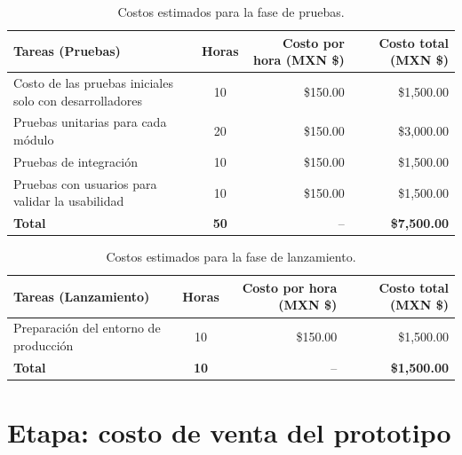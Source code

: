 \begin{table}[H]
	\centering
	\renewcommand{\arraystretch}{1.6}
	\setlength{\tabcolsep}{10pt}
	\Huge
	\begin{adjustbox}{max width=\textwidth}
		\begin{tabular}{|p{9.5cm}|c|r|r|}
			\hline
			\textbf{Tareas (Pruebas)} & \textbf{Horas} & \textbf{Costo por hora (MXN \$)} & \textbf{Costo total (MXN \$)} \\ \hline
			Costo de las pruebas iniciales solo con desarrolladores & 10 & \$150.00 & \$1,500.00 \\ \hline
			Pruebas unitarias para cada módulo & 20 & \$150.00 & \$3,000.00 \\ \hline
			Pruebas de integración & 10 & \$150.00 & \$1,500.00 \\ \hline
			Pruebas con usuarios para validar la usabilidad & 10 & \$150.00 & \$1,500.00 \\ \hline
			\textbf{Total} & \textbf{50} & -- & \textbf{\$7,500.00} \\ \hline
		\end{tabular}
	\end{adjustbox}
	\caption{Costos estimados para la fase de pruebas.}
	\label{tab:costos_pruebas_nuevo}
\end{table}

\begin{table}[H]
	\centering
	\renewcommand{\arraystretch}{1.6}
	\setlength{\tabcolsep}{10pt}
	\Huge
	\begin{adjustbox}{max width=\textwidth}
		\begin{tabular}{|p{9.5cm}|c|r|r|}
			\hline
			\textbf{Tareas (Lanzamiento)} & \textbf{Horas} & \textbf{Costo por hora (MXN \$)} & \textbf{Costo total (MXN \$)} \\ \hline
			Preparación del entorno de producción & 10 & \$150.00 & \$1,500.00 \\ \hline
			\textbf{Total} & \textbf{10} & -- & \textbf{\$1,500.00} \\ \hline
		\end{tabular}
	\end{adjustbox}
	\caption{Costos estimados para la fase de lanzamiento.}
	\label{tab:costos_lanzamiento_nuevo}
\end{table}


\section{Etapa: costo de venta del prototipo}

